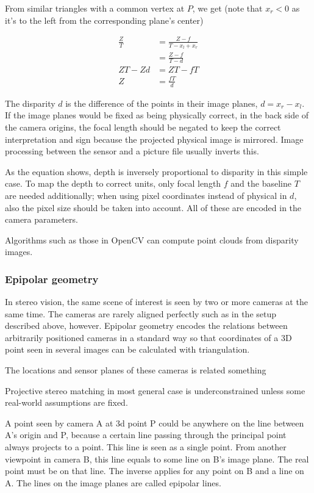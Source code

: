 From similar triangles with a common vertex at $P$, we get (note that $x_r < 0$ as it's to the left from the corresponding plane's center)

\begin{align}
	\frac{Z}{T} &= \frac{Z-f}{T - x_l + x_r} \\
	&= \frac{Z-f}{T - d}\\
	ZT - Zd &= ZT - fT\\
	Z &= \frac{fT}{d}
\end{align}

The disparity $d$ is the difference of the points in their image planes, $d = x_r - x_l$.
If the image planes would be fixed as being physically correct, in the back side of the camera origins, the focal length should be negated to keep the correct interpretation and sign because the projected physical image is mirrored. Image processing between the sensor and a picture file usually inverts this.

As the equation shows, depth is inversely proportional to disparity in this simple case.
To map the depth to correct units, only focal length $f$ and the baseline $T$ are needed additionally; when using pixel coordinates instead of physical in $d$, also the pixel size should be taken into account.
All of these are encoded in the camera parameters.

Algorithms such as those in OpenCV can compute point clouds from disparity images.

\subsubsection{Epipolar geometry}

In stereo vision, the same scene of interest is seen by two or more cameras at the same time.
The cameras are rarely aligned perfectly such as in the setup described above, however.
Epipolar geometry encodes the relations between arbitrarily positioned cameras in a standard way so that coordinates of a 3D point seen in several images can be calculated with triangulation.

The locations and sensor planes of these cameras is related something

Projective stereo matching in most general case is underconstrained unless some real-world assumptions are fixed.



A point seen by camera A at 3d point P could be anywhere on the line between A's origin and P, because a certain line passing through the principal point always projects to a point.
This line is seen as a single point.
From another viewpoint in camera B, this line equals to some line on B's image plane.
The real point must be on that line.
The inverse applies for any point on B and a line on A.
The lines on the image planes are called epipolar lines.


